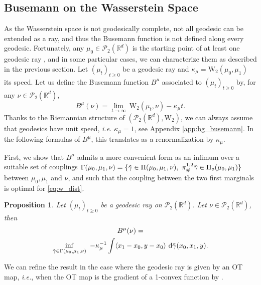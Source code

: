 \documentclass[twoside]{article}
\newtheorem{proposition}{Proposition}
\newcommand{\cP}{\mathcal{P}}
\newcommand{\W}{\mathrm{W}}
\newcommand{\R}{\mathbb{R}}
\begin{document}
\subsection{Busemann on the Wasserstein Space}

As the Wasserstein space is not geodesically complete, not all geodesic can be extended as a ray, and thus the Busemann function is not defined along every geodesic. Fortunately, any $\mu_0\in\cP_2(\R^d)$ is the starting point of at least one geodesic ray \citep[Theorem 1.1]{zhu2021busemann}, and in some particular cases, we can characterize them as described in the previous section. Let $(\mu_t)_{t\ge 0}$ be a geodesic ray and $\kappa_\mu=\W_2(\mu_0,\mu_1)$ its speed. Let us define the Busemann function $B^\mu$ associated to $(\mu_t)_{t\ge 0}$ by, for any $\nu\in\cP_2(\R^d)$,
\begin{equation}
    B^\mu(\nu)=\lim_{t\to\infty}\ \W_2(\mu_t,\nu) - \kappa_\mu t.
\end{equation}
 Thanks to the Riemannian structure of $(\cP_2(\R^d),\W_2)$, we can always assume that geodesics have unit speed, \emph{i.e.} $\kappa_\mu=1$, see Appendix \ref{app:bg_busemann}. In the following formulas of $B^\mu$, this translates as a renormalization by $\kappa_\mu$.

First, we show that $B^\mu$ admits a more convenient form as an infimum over a suitable set of couplings $\Gamma(\mu_0,\mu_1,\nu) = \{\Tilde{\gamma}\in \Pi(\mu_0,\mu_1,\nu),\ \pi^{1,2}_\#\Tilde{\gamma}\in\Pi_o(\mu_0,\mu_1)\}$ between $\mu_0,\mu_1$ and $\nu$, and such that the coupling between the two first marginals is optimal for \eqref{eq:w_dist}.
\begin{proposition} \label{prop:busemann_general}
    Let $(\mu_t)_{t\ge 0}$ be a geodesic ray on $\cP_2(\R^d)$. Let $\nu\in\cP_2(\mathbb{R}^d)$, then
    \begin{multline} \label{eq:busemann_general}
        \raisetag{40pt}
        B^\mu(\nu)  = \\   
        \inf_{\Tilde{\gamma}\in\Gamma(\mu_0,\mu_1,\nu)}\ -\kappa_\mu^{-1} \int \langle x_1-x_0,y-x_0\rangle\ \mathrm{d}\Tilde{\gamma}(x_0,x_1,y).
    \end{multline}    
\end{proposition}


 We can refine the result in the case where the geodesic ray is given by an OT map, \emph{i.e.}, when the OT map is the gradient of a 1-convex function by .
\end{document}
